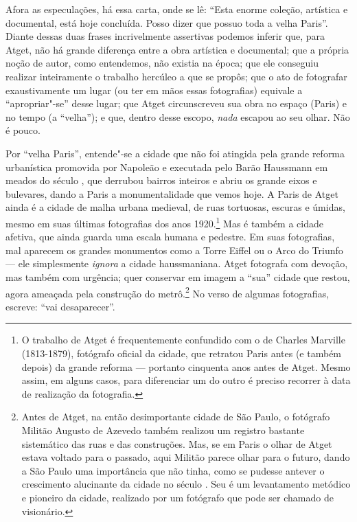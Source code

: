 Afora as especulações, há essa carta, onde se lê: ``Esta enorme coleção,
artística e documental, está hoje concluída. Posso dizer que possuo toda
a velha Paris''. Diante dessas duas frases incrivelmente assertivas
podemos inferir que, para Atget, não há grande diferença entre a obra
artística e documental; que a própria noção de autor, como entendemos,
não existia na época; que ele conseguiu realizar inteiramente o trabalho
hercúleo a que se propôs; que o ato de fotografar exaustivamente um
lugar (ou ter em mãos essas fotografias) equivale a ``apropriar"-se''
desse lugar; que Atget circunscreveu sua obra no espaço (Paris) e no
tempo (a ``velha''); e que, dentro desse escopo, \emph{nada} escapou ao
seu olhar. Não é pouco.

Por ``velha Paris'', entende"-se a cidade que não foi atingida pela
grande reforma urbanística promovida por Napoleão  e executada pelo
Barão Haussmann em meados do século , que derrubou bairros inteiros e
abriu os grande eixos e bulevares, dando a Paris a monumentalidade que
vemos hoje. A Paris de Atget ainda é a cidade de malha urbana medieval,
de ruas tortuosas, escuras e úmidas, mesmo em suas últimas fotografias
dos anos 1920.\footnote{O trabalho de Atget é frequentemente confundido
  com o de Charles Marville (1813-1879), fotógrafo oficial da cidade, que
  retratou Paris antes (e também depois) da grande reforma --- portanto
  cinquenta anos antes de Atget. Mesmo assim, em alguns casos, para
  diferenciar um do outro é preciso recorrer à data de realização da
  fotografia.} Mas é também a cidade afetiva, que ainda guarda uma
escala humana e pedestre. Em suas fotografias, mal aparecem os grandes
monumentos como a Torre Eiffel ou o Arco do Triunfo --- ele simplesmente
\emph{ignora} a cidade haussmaniana. Atget fotografa com devoção, mas
também com urgência; quer conservar em imagem a ``sua'' cidade que
restou, agora ameaçada pela construção do metrô.\footnote{Antes de
  Atget, na então desimportante cidade de São Paulo, o fotógrafo Militão
  Augusto de Azevedo também realizou um registro bastante sistemático
  das ruas e das construções. Mas, se em Paris o olhar de Atget estava
  voltado para o passado, aqui Militão parece olhar para o futuro, dando
  a São Paulo uma importância que não tinha, como se pudesse antever o
  crescimento alucinante da cidade no século . Seu {} é um levantamento
  metódico e pioneiro da cidade, realizado por um fotógrafo que pode ser
  chamado de visionário.} No verso de algumas fotografias, escreve:
``vai desaparecer''.

